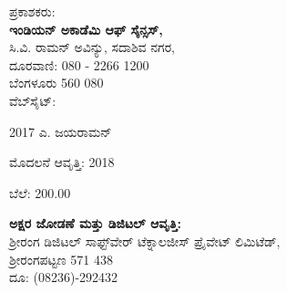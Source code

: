 

\begin{flushleft}
ಪ್ರಕಾಶಕರು:\\\textbf{ಇಂಡಿಯನ್ ಅಕಾಡೆಮಿ ಆಫ್ ಸೈನ್ಸಸ್,}\\
 ಸಿ.ವಿ. ರಾಮನ್ ಅವಿನ್ಯು, ಸದಾಶಿವ ನಗರ,\\
 ದೂರವಾಣಿ: 080 - 2266 1200\\
 ಬೆಂಗಳೂರು 560 080\\
 ವೆಬ್‍ಸೈಟ್: 
\end{flushleft}

\vfill

\noindent {} 2017 ಎ. ಜಯರಾಮನ್

\noindent ಮೊದಲನೆ ಆವೃತ್ತಿ: 2018

\noindent ಬೆಲೆ: 200.00

\vfill

\begin{flushleft}
 \textbf{ಅಕ್ಷರ ಜೋಡಣೆ ಮತ್ತು ಡಿಜಿಟಲ್ ಆವೃತ್ತಿ:}\\
 ಶ‍್ರೀರಂಗ ಡಿಜಿಟಲ್ ಸಾಫ್ಟ್‌ವೇರ್ ಟೆಕ್ನಾಲಜೀಸ್ ಪ್ರೈವೇಟ್ ಲಿಮಿಟೆಡ್,\\
 ಶ‍್ರೀರಂಗಪಟ್ಟಣ 571 438\\ 
 ದೂ: (08236)-292432
\end{flushleft}

